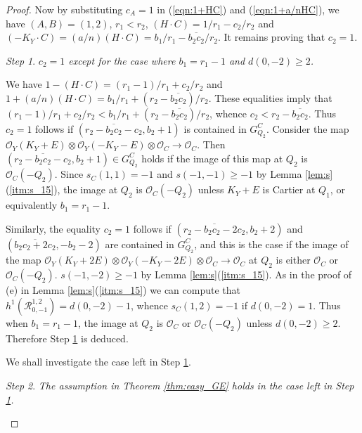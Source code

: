 \documentclass[a4paper,11pt]{amsart}
\theoremstyle{definition}
\theoremstyle{remark}
\newtheorem{step}{Step}
\numberwithin{equation}{section}
\newcommand{\cO}{{\mathcal O}}
\newcommand{\calR}{{\mathcal R}}
\begin{document}
\begin{proof}
Now by substituting $c_A=1$ in (\ref{eqn:1+HC}) and (\ref{eqn:1+a/nHC}),
we have $(A, B)=(1, 2)$, $r_1<r_2$, $(H \cdot C)=1/r_1-c_2/r_2$
and $(-K_Y \cdot C)=(a/n)(H \cdot C)=b_1/r_1-\overline{b_2c_2}/r_2$.
It remains proving that $c_2=1$.

\begin{step}\label{stp:true/false-3}
\itshape
$c_2=1$ except for the case where $b_1=r_1-1$ and $d(0,-2)\ge2$.
\end{step}

We have $1-(H \cdot C)=(r_1-1)/r_1+c_2/r_2$
and $1+(a/n)(H \cdot C)=b_1/r_1+(r_2-\overline{b_2c_2})/r_2$.
These equalities imply that
$(r_1-1)/r_1+c_2/r_2<b_1/r_1+(r_2-\overline{b_2c_2})/r_2$,
whence $c_2<r_2-\overline{b_2c_2}$.
Thus $c_2=1$ follows if
$(r_2-\overline{b_2c_2}-c_2,b_2+1)$ is contained in $G_{Q_2}^C$.
Consider the map
$\cO_Y(K_Y+E) \otimes \cO_Y(-K_Y-E) \otimes \cO_C \to \cO_C$.
Then $(r_2-\overline{b_2c_2}-c_2,b_2+1) \in G_{Q_2}^C$ holds
if the image of this map at $Q_2$ is $\cO_C(-Q_2)$.
Since $s_C(1,1)=-1$ and $s(-1,-1)\ge-1$ by Lemma \ref{lem:s}(\ref{itm:s_15}),
the image at $Q_2$ is $\cO_C(-Q_2)$
unless $K_Y+E$ is Cartier at $Q_1$,
or equivalently $b_1=r_1-1$.

Similarly,
the equality $c_2=1$ follows if
$(\overline{r_2-b_2c_2-2c_2},b_2+2)$ and
$(\overline{b_2c_2+2c_2},-b_2-2)$ are contained in $G_{Q_2}^C$,
and this is the case if the image of the map
$\cO_Y(K_Y+2E) \otimes \cO_Y(-K_Y-2E) \otimes \cO_C \to \cO_C$
at $Q_2$ is either $\cO_C$ or $\cO_C(-Q_2)$.
$s(-1,-2)\ge-1$ by Lemma \ref{lem:s}(\ref{itm:s_15}).
As in the proof of (e) in Lemma \ref{lem:s}(\ref{itm:s_15})
we can compute that $h^1(\calR_{0,-1}^{1,2})=d(0,-2)-1$,
whence $s_C(1,2)=-1$ if $d(0,-2)=1$.
Thus when $b_1=r_1-1$,
the image at $Q_2$ is $\cO_C$ or $\cO_C(-Q_2)$ unless $d(0,-2)\ge2$.
Therefore Step \ref{stp:true/false-3} is deduced.

We shall investigate the case left in Step \ref{stp:true/false-3}.

\begin{step}\label{stp:true/false-4}
\itshape
The assumption in Theorem \textup{\ref{thm:easy_GE}} holds
in the case left in Step \textup{\ref{stp:true/false-3}}.
\end{step}


\end{proof}
\end{document}
